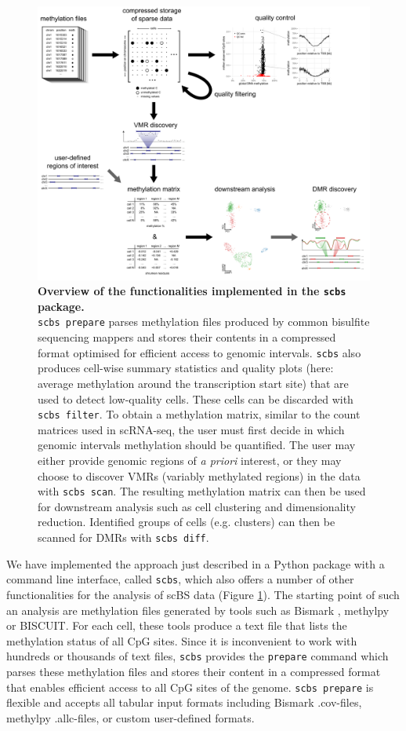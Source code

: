 \documentclass[twocolumn,10pt]{article}
\begin{document}
\begin{figure}[t]
    \begin{center}
        \includegraphics[width=.8\textwidth]{figures/Fig_workflow.png}
    \end{center}
    \caption{\small \textbf{Overview of the functionalities implemented in the \texttt{scbs} package.}\\
        \texttt{scbs prepare} parses methylation files produced by common bisulfite sequencing mappers and stores their contents in a compressed format optimised for efficient access to genomic intervals.
        \texttt{scbs} also produces cell-wise summary statistics and quality plots (here: average methylation around the transcription start site) that are used to detect low-quality cells.
        These cells can be discarded with \texttt{scbs filter}.
        To obtain a methylation matrix, similar to the count matrices used in scRNA-seq, the user must first decide in which genomic intervals methylation should be quantified.
        The user may either provide genomic regions of \emph{a priori} interest, or they may choose to discover VMRs (variably methylated regions) in the data with \texttt{scbs scan}.
        The resulting methylation matrix can then be used for downstream analysis such as cell clustering and dimensionality reduction.
        Identified groups of cells (e.g. clusters) can then be scanned for DMRs with \texttt{scbs diff}.
    }
    \label{fig:workflow}
\end{figure}

We have implemented the approach just described in a Python package with a command line interface, called \texttt{scbs}, which also offers a number of other functionalities for the analysis of scBS data (Figure \ref{fig:workflow}).
The starting point of such an analysis are methylation files generated by tools such as Bismark \citep{bismark}, methylpy \citep{methylpy} or BISCUIT.
For each cell, these tools produce a text file that lists the methylation status of all CpG sites.
Since it is inconvenient to work with hundreds or thousands of text files, \texttt{scbs} provides the \texttt{prepare} command which parses these methylation files and stores their content in a compressed format that enables efficient access to all CpG sites of the genome.
\texttt{scbs prepare} is flexible and accepts all tabular input formats including Bismark .cov-files, methylpy .allc-files, or custom user-defined formats.
\end{document}
